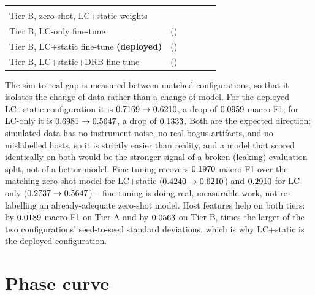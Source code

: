 \begin{table}[htb]
\begin{tabular}{L{4.6cm}rrrrr}
  \ZeroShotLCOnlyFII{} \\
Tier B, zero-shot, LC+static weights & \ZeroShotMacroF{} &
  \ZeroShotRocAucIa{} & \ZeroShotFIa{} & \ZeroShotFIbc{} & \ZeroShotFII{} \\
Tier B, LC-only fine-tune & \LCOnlyMacroF{} (\LCOnlyMacroFSD{}) &
  \LCOnlyRocAucIa{} & \LCOnlyFIa{} & \LCOnlyFIbc{} & \LCOnlyFII{} \\
Tier B, LC+static fine-tune \textbf{(deployed)} & \WithStaticMacroF{}
  (\WithStaticMacroFSD{}) & \WithStaticRocAucIa{} & \WithStaticFIa{} &
  \WithStaticFIbc{} & \WithStaticFII{} \\
Tier B, LC+static+DRB fine-tune & \WithStaticDRBMacroF{}
  (\WithStaticDRBMacroFSD{}) & \WithStaticDRBRocAucIa{} & \WithStaticDRBFIa{} &
  \WithStaticDRBFIbc{} & \WithStaticDRBFII{} \\
\bottomrule
\end{tabular}
\end{table}

The sim-to-real gap is measured between matched configurations, so that it
isolates the change of data rather than a change of model. For the
deployed LC+static configuration it is
$0.7169{} \to 0.6210{}$, a drop of
$0.0959{}$ macro-F1; for LC-only it is
$0.6981{} \to 0.5647{}$, a drop of
$0.1333{}$. Both are the expected direction: simulated data has
no instrument noise, no real-bogus artifacts, and no mislabelled hosts, so
it is strictly easier than reality, and a model that scored identically on
both would be the stronger signal of a broken (leaking) evaluation split,
not of a better model. Fine-tuning recovers $0.1970{}$ macro-F1 over
the matching zero-shot model for LC+static
($0.4240{} \to 0.6210{}$) and $0.2910{}$ for
LC-only ($0.2737{} \to 0.5647{}$) -- fine-tuning is
doing real, measurable work, not re-labelling an already-adequate zero-shot
model. Host features help on both tiers: by $0.0189{}$ macro-F1 on
Tier A and by $0.0563{}$ on Tier B, \StaticGainOverSD{} times the larger of
the two configurations' seed-to-seed standard deviations, which is why
LC+static is the deployed configuration.

\section{Phase curve}


